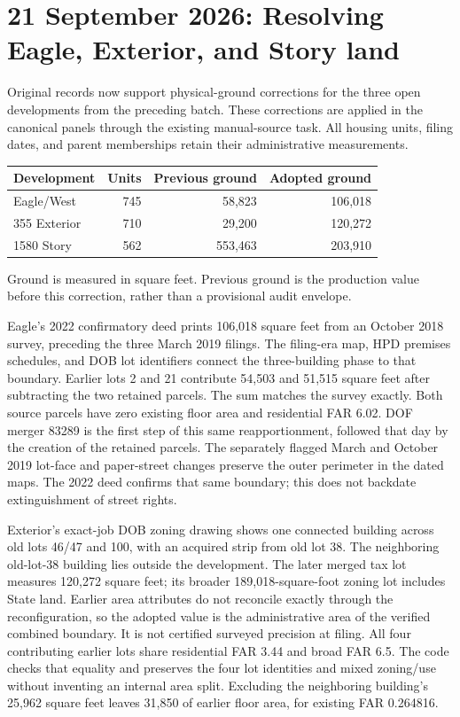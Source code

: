 \clearpage
\section{21 September 2026: Resolving Eagle, Exterior, and Story land}

Original records now support physical-ground corrections for the three open
developments from the preceding batch. These corrections are applied in the
canonical panels through the existing manual-source task. All housing units,
filing dates, and parent memberships retain their administrative measurements.

\begin{center}
\small
\begin{tabular}{lrrr}
\hline
Development & Units & Previous ground & Adopted ground \\
\hline
Eagle/West & 745 & 58,823 & 106,018 \\
355 Exterior & 710 & 29,200 & 120,272 \\
1580 Story & 562 & 553,463 & 203,910 \\
\hline
\end{tabular}
\end{center}
\noindent Ground is measured in square feet. Previous ground is the production
value before this correction, rather than a provisional audit envelope.

Eagle's 2022 confirmatory deed prints 106,018 square feet from an October 2018
survey, preceding the three March 2019 filings. The filing-era map, HPD
premises schedules, and DOB lot identifiers connect the three-building phase
to that boundary. Earlier lots 2 and 21 contribute 54,503 and 51,515 square
feet after subtracting the two retained parcels. The sum matches the survey
exactly. Both source parcels have zero existing floor area and residential
FAR 6.02. DOF merger 83289 is the first step of this same reapportionment,
followed that day by the creation of the retained parcels. The separately
flagged March and October 2019 lot-face and paper-street changes preserve the
outer perimeter in the dated maps. The 2022 deed confirms that same boundary;
this does not backdate extinguishment of street rights.

Exterior's exact-job DOB zoning drawing shows one connected building across
old lots 46/47 and 100, with an acquired strip from old lot 38. The neighboring
old-lot-38 building lies outside the development. The later merged tax lot
measures 120,272 square feet; its broader 189,018-square-foot zoning lot
includes State land. Earlier area attributes do not reconcile exactly through
the reconfiguration, so the adopted value is the administrative area of the
verified combined boundary. It is not certified surveyed precision at filing.
All four contributing earlier lots share residential FAR 3.44 and broad FAR
6.5. The code checks that equality and preserves the four lot identities and
mixed zoning/use without inventing an internal area split. Excluding the
neighboring building's 25,962 square feet leaves 31,850 of earlier floor area,
for existing FAR 0.264816.

